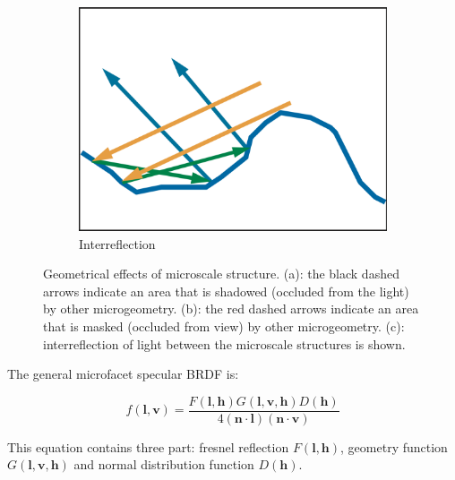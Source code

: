 \begin{figure}
\begin{center}
	\begin{subfigure}[b]{0.283\textwidth}
		\includegraphics[width=1.\textwidth]{graphics/gi/ray-optics-10-3}
		\caption{Interreflection}
	\end{subfigure}
\end{center}
\caption{Geometrical effects of microscale structure. (a): the black dashed arrows indicate an area that is shadowed (occluded from the light) by other microgeometry. (b): the red dashed arrows indicate an area that is masked (occluded from view) by other microgeometry. (c): interreflection of light between the microscale structures is shown.}
\end{figure}

The general microfacet specular BRDF is:

\begin{equation}
	f(\mathbf{l},\mathbf{v})=\frac{F(\mathbf{l},\mathbf{h})G(\mathbf{l},\mathbf{v},\mathbf{h})D(\mathbf{h})}{4(\mathbf{n}\cdot\mathbf{l})(\mathbf{n}\cdot\mathbf{v})}
\end{equation}

This equation contains three part: fresnel reflection $F(\mathbf{l},\mathbf{h})$, geometry function $G(\mathbf{l},\mathbf{v},\mathbf{h})$ and  normal distribution function $D(\mathbf{h})$.


